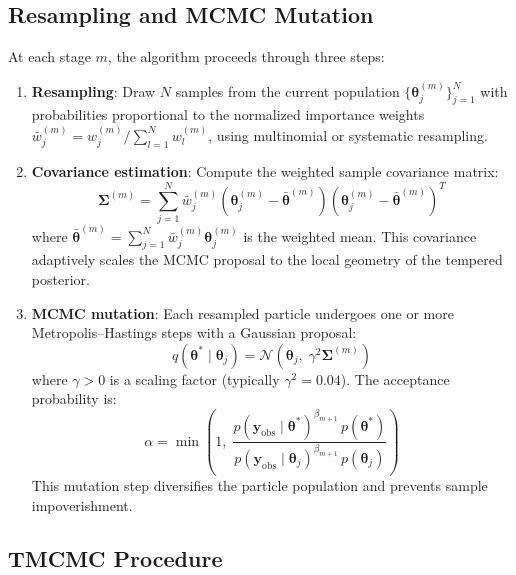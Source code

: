 \documentclass[11pt,a4paper]{article}
\begin{document}
\subsection{Resampling and MCMC Mutation}

At each stage $m$, the algorithm proceeds through three steps:
\begin{enumerate}
    \item \textbf{Resampling}: Draw $N$ samples from the current population $\{\boldsymbol{\theta}_j^{(m)}\}_{j=1}^{N}$ with probabilities proportional to the normalized importance weights $\bar{w}_j^{(m)} = w_j^{(m)} / \sum_{l=1}^{N} w_l^{(m)}$, using multinomial or systematic resampling.

    \item \textbf{Covariance estimation}: Compute the weighted sample covariance matrix:
    \begin{equation}
    \boldsymbol{\Sigma}^{(m)} = \sum_{j=1}^{N} \bar{w}_j^{(m)} \left(\boldsymbol{\theta}_j^{(m)} - \bar{\boldsymbol{\theta}}^{(m)}\right)\!\left(\boldsymbol{\theta}_j^{(m)} - \bar{\boldsymbol{\theta}}^{(m)}\right)^{\!T}
    \end{equation}
    where $\bar{\boldsymbol{\theta}}^{(m)} = \sum_{j=1}^{N} \bar{w}_j^{(m)} \boldsymbol{\theta}_j^{(m)}$ is the weighted mean. This covariance adaptively scales the MCMC proposal to the local geometry of the tempered posterior.

    \item \textbf{MCMC mutation}: Each resampled particle undergoes one or more Metropolis--Hastings steps with a Gaussian proposal:
    \begin{equation}
    q(\boldsymbol{\theta}^* \mid \boldsymbol{\theta}_j) = \mathcal{N}\!\left(\boldsymbol{\theta}_j,\; \gamma^2 \boldsymbol{\Sigma}^{(m)}\right)
    \end{equation}
    where $\gamma > 0$ is a scaling factor (typically $\gamma^2 = 0.04$). The acceptance probability is:
    \begin{equation}
    \alpha = \min\!\left(1,\; \frac{p(\mathbf{y}_{\mathrm{obs}} \mid \boldsymbol{\theta}^*)^{\beta_{m+1}}\, p(\boldsymbol{\theta}^*)}{p(\mathbf{y}_{\mathrm{obs}} \mid \boldsymbol{\theta}_j)^{\beta_{m+1}}\, p(\boldsymbol{\theta}_j)}\right)
    \label{eq:acceptance}
    \end{equation}
    This mutation step diversifies the particle population and prevents sample impoverishment.
\end{enumerate}

\subsection{TMCMC Procedure}
\end{document}
